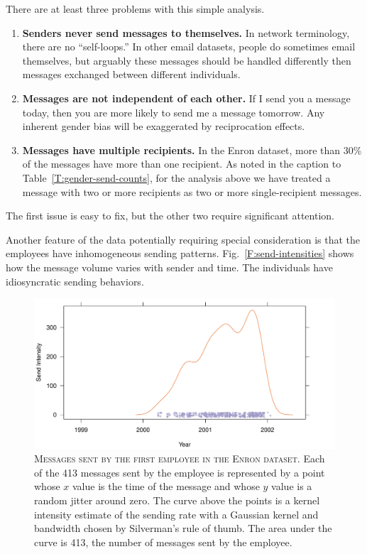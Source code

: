 \documentclass[aoas,preprint]{imsart}
\begin{document}
There are at least three problems with this simple analysis.
\begin{enumerate}
    \item \textbf{Senders never send messages to themselves.} In network
    terminology, there are no ``self-loops.'' In other email datasets, people
    do sometimes email themselves, but arguably these messages should be
    handled differently then messages exchanged between different individuals.
    
    \item \textbf{Messages are not independent of each other.} If I send
    you a message today, then you are more likely to send me a message
    tomorrow.  Any inherent gender bias will be exaggerated by
    reciprocation effects.
    
    \item \textbf{Messages have multiple recipients.} In the Enron dataset,
    more than 30\% of the messages have more than one recipient.  As noted in
    the caption to Table~\ref{T:gender-send-counts}, for the analysis above
    we have treated a message with two or more recipients as two or more
    single-recipient messages.
\end{enumerate}
The first issue is easy to fix, but the other two require significant
attention.

Another feature of the data potentially requiring special consideration is
that the employees have inhomogeneous sending patterns. 
Fig.~\ref{F:send-intensities} shows how the message volume varies with
sender and time.  The individuals have idiosyncratic sending behaviors.

\begin{figure}
    \includegraphics[scale=0.6]{figures/kernel-intensity}
    \caption{
        \textsc{Messages sent by the first employee in the Enron dataset.}
        Each of the 413 messages sent by the employee is represented by a point
        whose $x$ value is the time of the message and whose $y$ value is a
        random jitter around zero.  The curve above the points is a kernel
        intensity estimate of the sending rate with a Gaussian kernel
        and bandwidth chosen by Silverman's rule of thumb.  The area
        under the curve is 413, the number of messages sent by the
        employee.
    }
    \label{F:kernel-intensity}
\end{figure}
\end{document}
